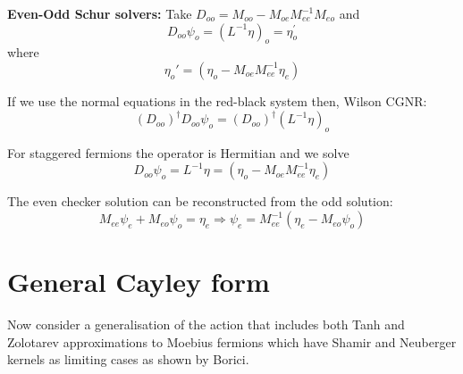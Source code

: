 \documentclass[letter,10pt]{report}
\begin{document}
{\bf Even-Odd Schur solvers:}
Take $D_{oo} = M_{oo} - M_{oe} M_{ee}^{-1} M_{eo}$ and 
$$
D_{oo} \psi_o =  (L^{-1}  \eta)_o = \eta_o^\prime
$$
where
$$\eta_o' = (\eta_o - M_{oe} M_{ee}^{-1} \eta_e)$$

If we use the normal equations in the red-black system then,
Wilson CGNR:
$$      (D_{oo})^{\dag} D_{oo} \psi_o = (D_{oo})^\dagger (L^{-1}  \eta)_o$$

For staggered fermions the operator is Hermitian and we solve
$$
D_{oo} \psi_o = L^{-1}  \eta =    (\eta_o - M_{oe} M_{ee}^{-1} \eta_e)
$$

The even checker solution can be reconstructed from the odd solution:
$$
M_{ee} \psi_e + M_{eo} \psi_o = \eta_e \Rightarrow  \psi_e = M_{ee}^{-1}  ( \eta_e - M_{eo} \psi_o )
$$

\chapter{General Cayley form}

Now consider a generalisation of the action that includes
both Tanh and Zolotarev approximations to  Moebius fermions
\cite{Brower:2004xi,Brower:2005qw}
which have Shamir and Neuberger kernels as limiting cases as
shown by Borici\cite{Borici:1999zw,Borici:1999da}.
\end{document}
